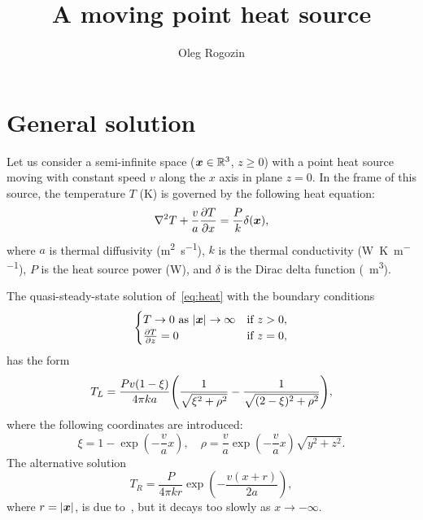 \documentclass{article}
\title{A moving point heat source}
\author{Oleg Rogozin}
\newcommand{\bx}{\vb*{x}}
\begin{document}
\maketitle

\section{General solution}

Let us consider a semi-infinite space ($\bx\in\mathbb{R}^3$, $z\geq0$) with a point heat source
moving with constant speed $v$ along the $x$ axis in plane $z=0$.
In the frame of this source, the temperature $T$ (\si{K}) is governed by the following heat equation:
\begin{equation}\label{eq:heat}
    \laplacian{T} + \frac{v}{a}\pdv{T}{x} = \frac{P}{k}\delta(\bx),
\end{equation}
where $a$ is thermal diffusivity (\si{\m\squared\per\s}),
$k$ is the thermal conductivity (\si{\W\per\K\per\m}),
$P$ is the heat source power (\si{\W}),
and $\delta$ is the Dirac delta function (\si{\per\m\cubed}).

The quasi-steady-state solution of~\eqref{eq:heat} with the boundary conditions
\begin{equation}\label{eq:bc}
    \begin{cases}
        T\to0 \text{ as } |\bx|\to\infty & \text{if } z>0, \\
        \pdv{T}{z}=0 & \text{if } z=0,
    \end{cases}
\end{equation}
has the form~\autocite{levin2008general}
\begin{equation}\label{eq:TL}
    T_L = \frac{Pv(1-\xi)}{4\pi ka}\qty( \frac1{\sqrt{\xi^2 +\rho^2}} - \frac1{\sqrt{(2-\xi)^2 +\rho^2}} ),
\end{equation}
where the following coordinates are introduced:
\begin{equation}
    \xi = 1 - \exp(-\frac{v}{a}x), \quad
    \rho = \frac{v}{a}\exp(-\frac{v}{a}x)\sqrt{y^2 + z^2}.
\end{equation}
The alternative solution
\begin{equation}\label{eq:TR}
    T_R = \frac{P}{4\pi kr}\exp(-\frac{v(x+r)}{2a}),
\end{equation}
where $r = |\bx|$, is due to~\textcite{rosenthal1946theory}, but it decays too slowly as $x\to-\infty$.
\end{document}
